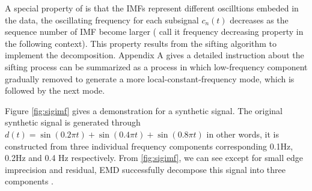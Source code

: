 A special property of  is that the IMFs represent different oscilltions embeded in the data,  the oscillating frequency for each subsignal $c_n(t)$ decreases as the sequence number of  IMF become larger ( call it  frequency decreasing property in the following context). This property results from the sifting algorithm  to implement the decomposition. Appendix A gives a detailed instruction about the sifting process can be summarized as a process in which low-frequency component  gradually removed to generate a more local-constant-frequency mode, which is followed by  the next mode.

Figure \ref{fig:sigimf} gives a demonstration for a synthetic signal. The original synthetic signal is generated through $d(t)=\sin(0.2\pi t)+\sin(0.4\pi t)+\sin(0.8\pi t)$\dlo{,}\wen{;} in other words, it is constructed from three individual frequency components corresponding  0.1\wen{ }Hz, 0.2\wen{ }Hz and 0.4 Hz\wen{,} respectively. From  \ref{fig:sigimf}, we can see  except for small edge imprecision and  residual, EMD successfully decompose this signal into three components .

